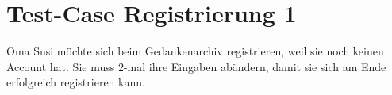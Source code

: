 \documentclass[]{article}
\title{}
\author{}
\begin{document}
\maketitle



\section{Test-Case Registrierung 1}
Oma Susi möchte sich beim Gedankenarchiv registrieren, weil sie noch keinen Account hat. 
Sie muss 2-mal ihre Eingaben abändern, damit sie sich am Ende erfolgreich registrieren kann.
\end{document}
